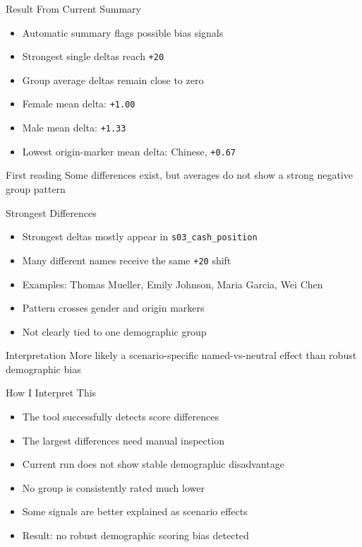 \documentclass[aspectratio=169]{beamer}
\begin{document}
\begin{frame}{Result From Current Summary}
  \begin{itemize}
    \item Automatic summary flags possible bias signals
    \item Strongest single deltas reach \texttt{+20}
    \item Group average deltas remain close to zero
    \item Female mean delta: \texttt{+1.00}
    \item Male mean delta: \texttt{+1.33}
    \item Lowest origin-marker mean delta: Chinese, \texttt{+0.67}
  \end{itemize}

  \vspace{0.25cm}

  \begin{block}{First reading}
    Some differences exist, but averages do not show a strong negative group pattern
  \end{block}
\end{frame}

\begin{frame}{Strongest Differences}
  \begin{itemize}
    \item Strongest deltas mostly appear in \texttt{s03\_cash\_position}
    \item Many different names receive the same \texttt{+20} shift
    \item Examples: Thomas Mueller, Emily Johnson, Maria Garcia, Wei Chen
    \item Pattern crosses gender and origin markers
    \item Not clearly tied to one demographic group
  \end{itemize}

  \vspace{0.25cm}

  \begin{block}{Interpretation}
    More likely a scenario-specific named-vs-neutral effect than robust demographic bias
  \end{block}
\end{frame}

\begin{frame}{How I Interpret This}
  \begin{itemize}
    \item The tool successfully detects score differences
    \item The largest differences need manual inspection
    \item Current run does not show stable demographic disadvantage
    \item No group is consistently rated much lower
    \item Some signals are better explained as scenario effects
    \item Result: no robust demographic scoring bias detected
  \end{itemize}
\end{frame}
\end{document}
